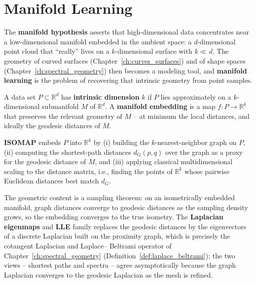 
\section{Manifold Learning}
\label{sec:data_ml_manifolds}

The \textbf{manifold hypothesis} asserts that
high-dimensional data concentrates near a low-dimensional manifold embedded
in the ambient space: a $d$-dimensional point cloud that ``really'' lives on
a $k$-dimensional surface with $k \ll d$. The geometry of curved surfaces
(Chapter~\ref{ch:curves_surfaces}) and of shape spaces
(Chapter~\ref{ch:spectral_geometry}) then becomes a modeling tool, and
\textbf{manifold learning} is the problem of
recovering that intrinsic geometry from point samples.

\begin{definition}\label{def:data_ml_intrinsic_dim}
  A data set $P \subset \mathbb{R}^d$ has \textbf{intrinsic dimension} $k$
  if $P$ lies approximately on a $k$-dimensional submanifold $M$ of
  $\mathbb{R}^d$. A \textbf{manifold embedding} is a map
  $f : P \to \mathbb{R}^k$ that preserves the relevant geometry of $M$ --
  at minimum the local distances, and ideally the geodesic distances of $M$.
\end{definition}

\begin{definition}[ISOMAP]\label{def:data_ml_isomap}
  \textbf{ISOMAP} embeds $P$ into $\mathbb{R}^k$ by (i) building the
  $k$-nearest-neighbor graph on $P$, (ii) computing the shortest-path
  distances $d_G(p, q)$ over the graph as a proxy for the geodesic distance
  of $M$, and (iii) applying classical multidimensional scaling to the
  distance matrix, i.e., finding the points of $\mathbb{R}^k$ whose pairwise
  Euclidean distances best match $d_G$.
\end{definition}

The geometric content is a sampling theorem: on an isometrically embedded
manifold, graph distances converge to geodesic distances as the sampling
density grows, so the embedding converges to the true isometry. The
\textbf{Laplacian eigenmaps} and \textbf{LLE} family replaces the geodesic
distances by the eigenvectors of a discrete Laplacian built on the
proximity graph, which is precisely the cotangent Laplacian and Laplace--
Beltrami operator of Chapter~\ref{ch:spectral_geometry}
(Definition~\ref{def:laplace_beltrami}); the two views -- shortest paths and
spectra -- agree asymptotically because the graph Laplacian converges to the
geodesic Laplacian as the mesh is refined.

